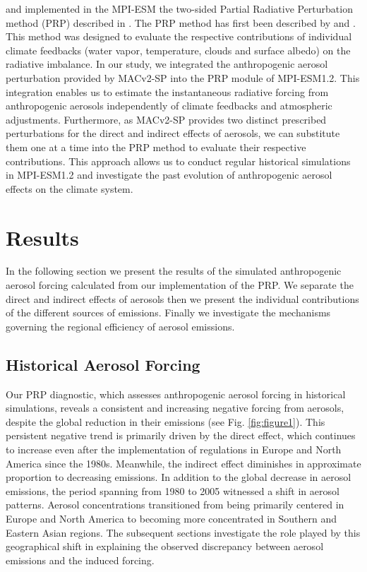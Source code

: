 \documentclass[draft]{agujournal2019}
\begin{document}
       and  implemented in the MPI-ESM the two-sided Partial Radiative Perturbation method (PRP) described in . The PRP method has first been described by  and . This method was designed to evaluate the respective contributions of individual climate feedbacks (water vapor, temperature, clouds and surface albedo) on the radiative imbalance. In our study, we integrated the anthropogenic aerosol perturbation provided by MACv2-SP into the PRP module of MPI-ESM1.2. This integration enables us to estimate the instantaneous radiative forcing from anthropogenic aerosols independently of climate feedbacks and atmospheric adjustments. Furthermore, as MACv2-SP provides two distinct prescribed perturbations for the direct and indirect effects of aerosols, we can substitute them one at a time into the PRP method to evaluate their respective contributions. This approach allows us to conduct regular historical simulations in MPI-ESM1.2 and investigate the past evolution of anthropogenic aerosol effects on the climate system.

\section{Results}
      In the following section we present the results of the simulated anthropogenic aerosol forcing calculated from our implementation of the PRP. We separate the direct and indirect effects of aerosols then we present the individual contributions of the different sources of emissions. Finally we investigate the mechanisms governing the regional efficiency of aerosol emissions.

      \subsection{Historical Aerosol Forcing}
            Our PRP diagnostic, which assesses anthropogenic aerosol forcing in historical simulations, reveals a consistent and increasing negative forcing from aerosols, despite the global reduction in their emissions (see Fig. \ref{fig:figure1}). This persistent negative trend is primarily driven by the direct effect, which continues to increase even after the implementation of regulations in Europe and North America since the 1980s. Meanwhile, the indirect effect diminishes in approximate proportion to decreasing emissions.
            In addition to the global decrease in aerosol emissions, the period spanning from 1980 to 2005 witnessed a shift in aerosol patterns. Aerosol concentrations transitioned from being primarily centered in Europe and North America to becoming more concentrated in Southern and Eastern Asian regions.
            The subsequent sections investigate the role played by this geographical shift in explaining the observed discrepancy between aerosol emissions and the induced forcing.
\end{document}

